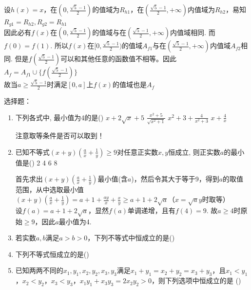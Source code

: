 \begin{enumerate}
\begin{jieda}
            设$h(x) = x$，在$(0,\frac{\sqrt{5}-1}{2})$的值域为$R_{h1}$，在$(\frac{\sqrt{5}-1}{2}, +\infty)$内值域为$R_{h2}$，易知$R_{g1} = R_{h2}, R_{g2} = R_{h1}$ \\
            因此必有$f(x)$在$(0,\frac{\sqrt{5}-1}{2})$的值域与在$(\frac{\sqrt{5}-1}{2}, +\infty)$内值域相同. 而$f(0) = f(1)$. 所以$f(x)$在$[0,\frac{\sqrt{5}-1}{2})$的值域$A_{f1}$与在$(\frac{\sqrt{5}-1}{2}, +\infty)$内值域$A_{f2}$相同. 但是$f(\frac{\sqrt{5}-1}{2})$可以和其他任意的函数值不相等。因此$A_f = A_{f1} \cup \{f(\frac{\sqrt{5}-1}{2})\}$ \\
            故当$a \geq \frac{\sqrt{5}-1}{2}$时满足$[0, a]$上$f(x)$的值域也是$A_f$
        \end{jieda}
\end{enumerate}
选择题：
\begin{enumerate}
    \item 下列各式中, 最小值为4的是\dotfill()
    \xx
    {$x+2\sqrt{x}+5$}
    {$\frac{x^2+5}{\sqrt{x^2+1}}$}
    {$x^2+3+\frac{4}{x^2+3}$}
    {$x+\frac{4}{x}$}
    \begin{jieda}
        注意取等条件是否可以取到！
    \end{jieda}
    \item 已知不等式$(x+y)\left(\frac{a}{x}+\frac{1}{y}\right)\geq 9$对任意正实数$x,y$恒成立, 则正实数$a$的最小值是\dotfill()
    \xx
    {2}
    {4}
    {6}
    {8}
    \begin{jieda}
        首先求出$(x+y)\left(\frac{a}{x}+\frac{1}{y}\right)$最小值(含$a$)，然后令其大于等于9，得到$a$的取值范围，从中选取最小值\\
        $(x+y)\left(\frac{a}{x}+\frac{1}{y}\right) = a + 1 + \frac{ay}{x} + \frac{x}{y} \geq a + 1 + 2\sqrt{a}$（$x  = \sqrt{a}y$时取等）\\
        设$f(a) = a+1+2\sqrt{a}$，显然$f(a)$单调递增，且有$f(4) = 9$. 故$a \geq 4$时原始$\geq 9$，因此$a$最小值为4.
    \end{jieda}
    \item 若实数$a, b$满足$a > b > 0$，下列不等式中恒成立的是\dotfill()
    \item 下列不等式恒成立的是\dotfill()
    \item 已知两两不同的$x_1, y_1, x_2, y_2, x_3, y_3$满足$x_1 + y_1 = x_2 + y_2 = x_3 + y_3$，且$x_1 < y_1$，$x_2 < y_2$，$x_3 < y_3$，$x_1y_1+x_3y_3=2x_2y_2 > 0$，则下列选项中恒成立的是 \dotfill()

\end{enumerate}
